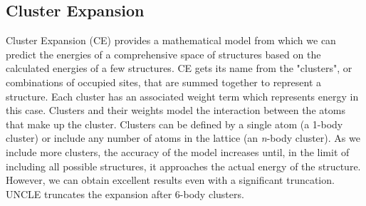 \documentclass[oneside, noacknowlegments]{BYUPhys}
\begin{document}
\subsection{Cluster Expansion}

Cluster Expansion (CE) provides a mathematical model from which we 
can predict the energies of a comprehensive space of structures 
based on the calculated energies of a few structures. CE gets its 
name from the "clusters", or combinations of occupied sites, that 
are summed together to represent a structure. Each cluster has an 
associated weight term which represents energy in this case. 
Clusters and their weights model the interaction between the atoms 
that make up the cluster. Clusters can be defined by a single 
atom (a 1-body cluster) or include any number of atoms in the 
lattice (an \textit{n}-body cluster). As we include more clusters, 
the accuracy of the model increases until, in the limit of 
including all possible structures, it approaches the actual energy 
of the structure. However, we can obtain excellent results even 
with a significant truncation. UNCLE truncates the expansion after 
6-body clusters.

\end{document}
